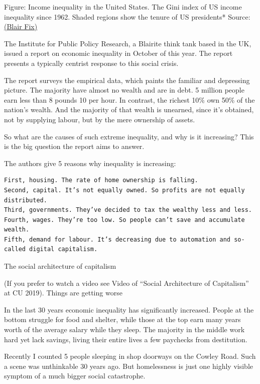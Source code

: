 \documentclass[
]{book}
\begin{document}
Figure: Income inequality in the United States.
The Gini index of US income inequality since 1962.
Shaded regions show the tenure of US presidents*
Source:\href{https://economicsfromthetopdown.com/2021/02/26/radically-progressive-degrowth-reducing-resource-use-by-eliminating-inequality/}{(Blair Fix)}

The Institute for Public Policy Research, a Blairite think tank based in the UK, issued a report on economic inequality in October of this year. The report presents a typically centrist response to this social crisis.

The report surveys the empirical data, which paints the familiar and depressing picture. The majority have almost no wealth and are in debt. 5 million people earn less than 8 pounds 10 per hour. In contrast, the richest 10\% own 50\% of the nation's wealth. And the majority of that wealth is unearned, since it's obtained, not by supplying labour, but by the mere ownership of assets.

So what are the causes of such extreme inequality, and why is it increasing? This is the big question the report aims to answer.

The authors give 5 reasons why inequality is increasing:

\begin{verbatim}
First, housing. The rate of home ownership is falling.
Second, capital. It’s not equally owned. So profits are not equally distributed.
Third, governments. They’ve decided to tax the wealthy less and less.
Fourth, wages. They’re too low. So people can’t save and accumulate wealth.
Fifth, demand for labour. It’s decreasing due to automation and so-called digital capitalism.
\end{verbatim}

The social architecture of capitalism

(If you prefer to watch a video see Video of ``Social Architecture of Capitalism'' at CU 2019).
Things are getting worse

In the last 30 years economic inequality has significantly increased. People at the bottom struggle for food and shelter, while those at the top earn many years worth of the average salary while they sleep. The majority in the middle work hard yet lack savings, living their entire lives a few paychecks from destitution.

Recently I counted 5 people sleeping in shop doorways on the Cowley Road. Such a scene was unthinkable 30 years ago. But homelessness is just one highly visible symptom of a much bigger social catastrophe.
\end{document}
